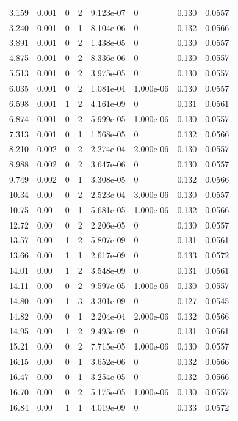 \documentclass[preview]{standalone}
\begin{document}
{{\begin{tabular}{L{1.2cm}C{1.2cm} C{0.3cm}C{0.5cm} C{1.4cm}C{1.4cm} C{1.4cm}C{1.4cm}}
  3.159  &  0.001  & 0     &  2 &  9.123e-07  & 0  & 0.130 &  0.0557   \\ 
  3.240  &  0.001  & 0     &  1 &  8.104e-06  & 0  & 0.132 &  0.0566   \\ 
  3.891  &  0.001  & 0     &  2 &  1.438e-05  & 0  & 0.130 &  0.0557   \\ 
  4.875  &  0.001  & 0     &  2 &  8.336e-06  & 0  & 0.130 &  0.0557   \\ 
  5.513  &  0.001  & 0     &  2 &  3.975e-05  & 0  & 0.130 &  0.0557   \\ 
  6.035  &  0.001  & 0     &  2 &  1.081e-04  & 1.000e-06  & 0.130 &  0.0557   \\ 
  6.598  &  0.001  & 1     &  2 &  4.161e-09  & 0  & 0.131 &  0.0561   \\ 
  6.874  &  0.001  & 0     &  2 &  5.999e-05  & 1.000e-06  & 0.130 &  0.0557   \\ 
  7.313  &  0.001  & 0     &  1 &  1.568e-05  & 0  & 0.132 &  0.0566   \\ 
  8.210  &  0.002  & 0     &  2 &  2.274e-04  & 2.000e-06  & 0.130 &  0.0557   \\ 
  8.988  &  0.002  & 0     &  2 &  3.647e-06  & 0  & 0.130 &  0.0557   \\ 
  9.749  &  0.002  & 0     &  1 &  3.308e-05  & 0  & 0.132 &  0.0566   \\ 
  10.34  &  0.00  & 0     &  2 &  2.523e-04  & 3.000e-06  & 0.130 &  0.0557   \\ 
  10.75  &  0.00  & 0     &  1 &  5.681e-05  & 1.000e-06  & 0.132 &  0.0566   \\ 
  12.72  &  0.00  & 0     &  2 &  2.206e-05  & 0  & 0.130 &  0.0557   \\ 
  13.57  &  0.00  & 1     &  2 &  5.807e-09  & 0  & 0.131 &  0.0561   \\ 
  13.66  &  0.00  & 1     &  1 &  2.617e-09  & 0  & 0.133 &  0.0572   \\ 
  14.01  &  0.00  & 1     &  2 &  3.548e-09  & 0  & 0.131 &  0.0561   \\ 
  14.11  &  0.00  & 0     &  2 &  9.597e-05  & 1.000e-06  & 0.130 &  0.0557   \\ 
  14.80  &  0.00  & 1     &  3 &  3.301e-09  & 0  & 0.127 &  0.0545   \\ 
  14.82  &  0.00  & 0     &  1 &  2.204e-04  & 2.000e-06  & 0.132 &  0.0566   \\ 
  14.95  &  0.00  & 1     &  2 &  9.493e-09  & 0  & 0.131 &  0.0561   \\ 
  15.21  &  0.00  & 0     &  2 &  7.715e-05  & 1.000e-06  & 0.130 &  0.0557   \\ 
  16.15  &  0.00  & 0     &  1 &  3.652e-06  & 0  & 0.132 &  0.0566   \\ 
  16.47  &  0.00  & 0     &  1 &  3.254e-05  & 0  & 0.132 &  0.0566   \\ 
  16.70  &  0.00  & 0     &  2 &  5.175e-05  & 1.000e-06  & 0.130 &  0.0557   \\ 
  16.84  &  0.00  & 1     &  1 &  4.019e-09  & 0  & 0.133 &  0.0572   \\ 
\hline 
\end{tabular} 

}}
\end{document}
